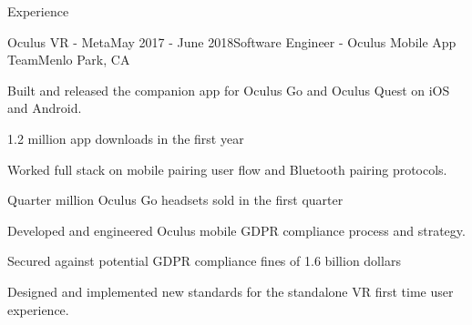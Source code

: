 \documentclass{resume} %
\begin{document}

\begin{rSection}{Experience}



  \setlength{\columnsep}{1cm}
  \setlength{\columnseprule}{1pt}
  \begin{rSubsection2}{Oculus VR - Meta}{May 2017 - June 2018}{Software Engineer - Oculus Mobile App Team}{Menlo Park, CA}
            \vspace{-0.5em}
        \begin{multicols}{2}
            \item Built and released the companion app for Oculus Go and Oculus Quest on iOS and Android.
            \item 1.2 million app downloads in the first year
        \end{multicols}
            \vspace{-1.9em}
        \begin{multicols}{2}
            \item Worked full stack on mobile pairing user flow and Bluetooth pairing protocols.
            \item Quarter million Oculus Go headsets sold in the first quarter 
        \end{multicols}
            \vspace{-1.9em}
        \begin{multicols}{2}
            \item Developed and engineered Oculus mobile GDPR compliance process and strategy.
            \item Secured against potential GDPR compliance fines of 1.6 billion dollars 
         \end{multicols}
            \vspace{-1.9em}
        \begin{multicols}{2}
            \item Designed and implemented new standards for the standalone VR first time user experience. 
            \item \ 
        \end{multicols}
            \vspace{-1em}
  \end{rSubsection2}


\end{rSection}
\end{document}

